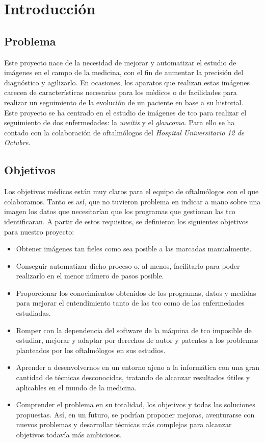 \chapter{Introducción}
\section{Problema}
Este proyecto nace de la necesidad de mejorar y automatizar el estudio
de imágenes en el campo de la medicina, con el fin de aumentar la
precisión del diagnóstico y agilizarlo. En ocasiones, los aparatos que
realizan estas imágenes carecen de características necesarias para los
médicos o de facilidades para realizar un seguimiento de la evolución
de un paciente en base a su historial.\\
Este proyecto se ha centrado en el estudio de imágenes de \gls{tco}
para realizar el seguimiento de dos enfermedades: la
\emph{\gls{uveitis}} y el \emph{\gls{glaucoma}}. Para ello se ha
contado con la colaboración de oftalmólogos del \emph{Hospital
  Universitario 12 de Octubre}.

\section{Objetivos}
Los objetivos médicos están muy claros para el equipo de oftalmólogos
con el que colaboramos. Tanto es así, que no tuvieron problema en
indicar a mano sobre una imagen los datos que necesitarían que los
programas que gestionan las \gls{tco} identificaran.  A partir de
estos requisitos, se definieron los siguientes objetivos para nuestro
proyecto:
\begin{itemize}
\item Obtener imágenes tan fieles como sea posible a las marcadas
  manualmente.
\item Conseguir automatizar dicho proceso o, al menos,
  facilitarlo para poder realizarlo en el menor número de pasos posible.
\item Proporcionar los conocimientos obtenidos de los programas, datos y
  medidas para mejorar el entendimiento tanto de las \gls{tco}
  como de las enfermedades estudiadas.
\item Romper con la dependencia del software de la máquina de \gls{tco}
  imposible de estudiar, mejorar y adaptar por derechos de autor y
  patentes a los problemas planteados por los oftalmólogos en sus
  estudios.
\item Aprender a desenvolvernos en un entorno ajeno a la informática
  con una gran cantidad de técnicas desconocidas, tratando de alcanzar
  resultados útiles y aplicables en el mundo de la medicina.
\item Comprender el problema en su totalidad, los objetivos y todas
  las soluciones propuestas. Así, en un futuro, se podrían proponer
  mejoras, aventurarse con nuevos problemas y desarrollar técnicas más
  complejas para alcanzar objetivos todavía más ambiciosos.
\end{itemize}
